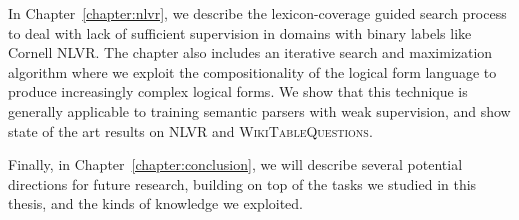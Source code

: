 In Chapter~\ref{chapter:nlvr}, we describe the lexicon-coverage guided search process to deal with
lack of sufficient supervision in domains with binary labels like Cornell NLVR\@.  The chapter also
includes an iterative search and maximization algorithm where we exploit the compositionality of the
logical form language to produce increasingly complex logical forms. We show that this technique is
generally applicable to training semantic parsers with weak supervision, and show state of the art
results on NLVR and \textsc{WikiTableQuestions}.

Finally, in Chapter~\ref{chapter:conclusion}, we will describe several potential directions for
future research, building on top of the tasks we studied in this thesis, and the kinds of knowledge
we exploited.

